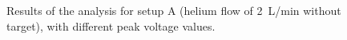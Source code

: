 \begin{figure}
{ }
 \hfill
 \caption{Results of the analysis for setup A (helium flow of \SI{2}{\liter/\minute} without target), with different peak voltage values.}
 \label{fig:elio_d}
\end{figure}

